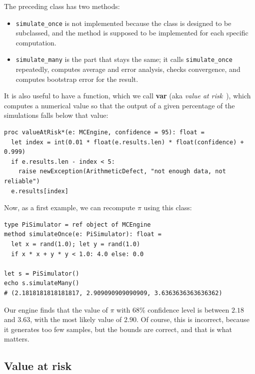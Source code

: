 \documentclass[justified, sixbynine]{tufte-book}
\def\ft{\small\tt}
\theoremstyle{plain}%
\newtheorem * {corollary}{Corollary}
\theoremstyle{definition}
\theoremstyle{remark}
\newtheorem * {remark}{Remark}
\newtheorem * {note}{Note}
\begin{document}
\begin{fullwidth}
The preceding class has two methods:
\begin{itemize}
\item {\ft simulate\_once} is not implemented because the class is designed to be subclassed, and the method is supposed to be implemented for each specific computation.
\item {\ft simulate\_many} is the part that stays the same; it calls {\ft simulate\_once} repeatedly, computes average and error analysis, checks convergence, and computes bootstrap error for the result.
\end{itemize}

It is also useful to have a function, which we call {\bf var} (aka {\it value at risk}~\cite{wilmott}), which computes a numerical value so that the output of a given percentage of the simulations falls below that value:

\begin{lstlisting}[caption={in file: {\ft nlib/montecarlo.nim}}]
proc valueAtRisk*(e: MCEngine, confidence = 95): float =
  let index = int(0.01 * float(e.results.len) * float(confidence) + 0.999)
  if e.results.len - index < 5:
    raise newException(ArithmeticDefect, "not enough data, not reliable")
  e.results[index]
\end{lstlisting}

Now, as a first example, we can recompute $\pi$ using this class:


\begin{lstlisting}
type PiSimulator = ref object of MCEngine
method simulateOnce(e: PiSimulator): float =
  let x = rand(1.0); let y = rand(1.0)
  if x * x + y * y < 1.0: 4.0 else: 0.0

let s = PiSimulator()
echo s.simulateMany()
# (2.1818181818181817, 2.909090909090909, 3.6363636363636362)
\end{lstlisting}

Our engine finds that the value of $\pi$ with 68\% confidence level is between $2.18$ and $3.63$, with the most likely value of $2.90$. Of course, this is incorrect, because it generates too few samples, but the bounds are correct, and that is what matters.

\subsection{Value at risk}


\end{fullwidth}
\end{document}
